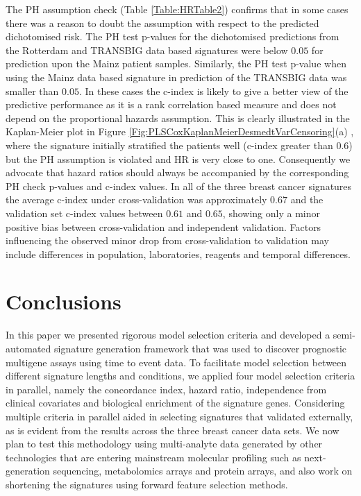 \documentclass[letterpaper,12pt]{article}
\begin{document}
The PH assumption check (Table \ref{Table:HRTable2}) confirms that in some cases there was a reason to doubt the assumption with respect to the predicted dichotomised risk. The PH test p-values for the dichotomised predictions from the Rotterdam and TRANSBIG data based signatures were below $0.05$ for prediction upon the Mainz patient samples. Similarly, the PH test p-value when using the Mainz data based signature in prediction of the TRANSBIG data was smaller than $0.05$. In these cases the c-index is likely to give a better view of the predictive performance as it is a rank correlation based measure and does not depend on the proportional hazards assumption. This is clearly illustrated in the Kaplan-Meier plot in Figure \ref{Fig:PLSCoxKaplanMeierDesmedtVarCensoring}(a)%
, where the signature initially stratified the patients well (c-index greater than $0.6$) but the PH assumption is violated and HR is very close to one. Consequently we advocate that hazard ratios should always be accompanied by the corresponding PH check p-values and c-index values. In all of the three breast cancer signatures the average c-index under cross-validation was approximately $0.67$ and the validation set c-index values between $0.61$ and $0.65$, showing only a minor positive bias between cross-validation and independent validation. Factors influencing the observed minor drop from cross-validation to validation may include differences in population, laboratories, reagents and temporal differences. 

\section{Conclusions}
In this paper we presented rigorous model selection criteria and developed a semi-automated signature generation framework that was used to discover prognostic multigene assays using time to event data. To facilitate model selection between different signature lengths and conditions, we applied four model selection criteria in parallel, namely the concordance index, hazard ratio, independence from clinical covariates and biological enrichment of the signature genes. Considering multiple criteria in parallel aided in selecting signatures that validated externally, as is evident from the results across the three breast cancer data sets.  We now plan to test this methodology using multi-analyte data generated by other technologies that are entering mainstream molecular profiling such as next-generation sequencing, metabolomics arrays and protein arrays, and also work on shortening the signatures using forward feature selection methods.











\end{document}
